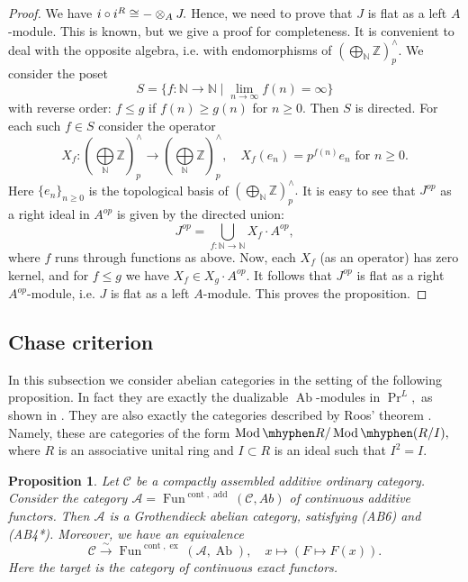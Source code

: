 \documentclass[11pt,leqno]{amsart}
\newtheorem{prop}[theo]{Proposition}
\numberwithin{equation}{section}
\def\N{\mathbb{N}}
\def\Z{\mathbb{Z}}
\newcommand{\tens}[1]{%
  \mathbin{\mathop{\otimes}\displaylimits_{#1}}%
}
\newcommand{\hy}{\mhyphen}
\newcommand{\biggplus}[1][]{\mathop{\bigoplus}\limits_{#1}}
\newcommand{\xto}{\xrightarrow}
\newcommand{\cont}{\operatorname{cont}}
\newcommand{\ex}{\operatorname{ex}}
\newcommand{\cA}{{\mathcal A}}
\newcommand{\cC}{{\mathcal C}}
\newcommand{\Fun}{\operatorname{Fun}}
\newcommand{\Ab}{\operatorname{Ab}}
\newcommand{\add}{\operatorname{add}}
\newcommand{\Mod}{\operatorname{Mod}}
\begin{document}
\begin{proof}
We have $i\circ i^R\cong -\tens{A}J.$ Hence, we need to prove that $J$ is flat as a left $A$-module. This is known, but we give a proof for completeness. It is convenient to deal with the opposite algebra, i.e. with endomorphisms of $(\biggplus[\N]\Z)^{\wedge}_p.$ We consider the poset 
\begin{equation*}
S= \{f:\N\to\N \mid \lim\limits_{n\to\infty}f(n)=\infty\}
\end{equation*} with reverse order: $f\leq g$ if $f(n)\geq g(n)$ for $n\geq 0.$ Then $S$ is directed. For each such $f\in S$ consider the operator 
\begin{equation*}
X_f:(\biggplus[\N]\Z)^{\wedge}_p\to (\biggplus[\N]\Z)^{\wedge}_p,\quad X_f(e_n)=p^{f(n)}e_n\text{ for }n\geq 0.
\end{equation*}
Here $\{e_n\}_{n\geq 0}$ is the topological basis of $(\biggplus[\N]\Z)^{\wedge}_p.$ It is easy to see that $J^{op}$ as a right ideal in $A^{op}$ is given by the directed union:
\begin{equation*}
J^{op}=\bigcup\limits_{f:\N\to\N} X_f\cdot A^{op},
\end{equation*}
where $f$ runs through functions as above. Now, each $X_f$ (as an operator) has zero kernel, and for $f\leq g$ we have $X_f\in X_g\cdot A^{op}.$ It follows that $J^{op}$ is flat as a right $A^{op}$-module, i.e. $J$ is flat as a left $A$-module. This proves the proposition.
\end{proof}

\subsection{Chase criterion}
\label{ssec:chase_criterion}

In this subsection we consider abelian categories in the setting of the following proposition. In fact they are exactly the dualizable $\Ab$-modules in $\Pr^L,$ as shown in \cite{LLS}. They are also exactly the categories described by Roos' theorem \cite{Roo65}. Namely, these are categories of the form $\Mod\hy R/\Mod\hy(R/I),$ where $R$ is an associative unital ring and $I\subset R$ is an ideal such that $I^2=I.$ 

\begin{prop}\label{prop:dualizable_Ab_modules}
Let $\cC$ be a compactly assembled additive ordinary category. Consider the category $\cA=\Fun^{\cont,\add}(\cC,Ab)$ of continuous additive functors. Then $\cA$ is a Grothendieck abelian category, satisfying (AB6) and (AB4*). Moreover, we have an equivalence
\begin{equation}\label{eq:Lazard_generalized}
\cC\xto{\sim}\Fun^{\cont,\ex}(\cA,\Ab),\quad x\mapsto (F\mapsto F(x)).
\end{equation}
Here the target is the category of continuous exact functors.
\end{prop}
\end{document}
